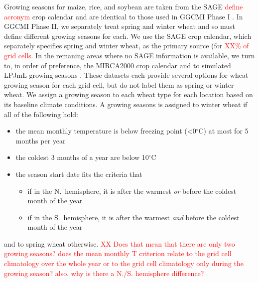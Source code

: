 \documentclass[gmd, manuscript]{copernicus} %
\begin{document}
Growing seasons for maize, rice, and soybean are taken from the SAGE \textcolor{red}{define acronym} crop calendar \citep{Sacks2010} and are identical to those used in GGCMI Phase I \citep{Elliott2015}.
In GGCMI Phase II, we separately treat spring and winter wheat and so must define different growing seasons for each.
We use the SAGE crop calendar, which separately specifies spring and winter wheat, as the primary source (for \textcolor{red}{XX\% of grid cells}. In the remaning areas where no SAGE information is available, we turn to, in order of preference, the MIRCA2000 crop calendar \citep{Portmann2010} and to simulated LPJmL growing seasons \citep{waha2012climate}.  These datasets each provide several options for wheat growing season for each grid cell, but do not label them as spring or winter wheat. We assign a growing season to each wheat type for each location based on its baseline climate conditions. 
A growing seasons is assigned to winter wheat if all of the following hold:
\begin{itemize} %
\item the mean monthly temperature is below freezing point (<0$^\circ$C) at most for 5 months per year 
\item the coldest 3 months of a year are below 10$^\circ$C
\item the season start date fits the criteria that
	\begin{itemize} 
		\item if in the N.\ hemisphere, it is after the warmest \textit{or} before the coldest month of the year 
		\item if in the S.\ hemisphere, it is after the warmest \textit{and} before the coldest month of the year 
    \end{itemize}
\end{itemize}
and to spring wheat otherwise. 
\textcolor{red}{XX Does that mean that there are only two growing seasons? does the mean monthly T criterion relate to the grid cell climatology over the whole year or to the grid cell climatology only during the growing season? also, why is there a N./S. hemisphere difference?}

\end{document}
